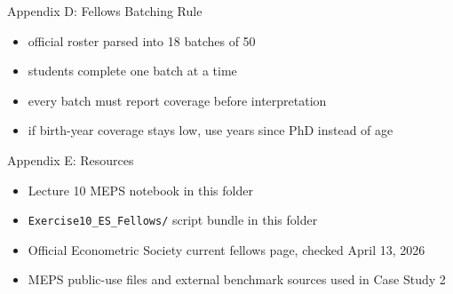 \documentclass[10pt,english,aspectratio=169]{beamer}
\begin{document}
\begin{frame}{Appendix D: Fellows Batching Rule}
\begin{itemize}
    \item official roster parsed into 18 batches of 50
    \item students complete one batch at a time
    \item every batch must report coverage before interpretation
    \item if birth-year coverage stays low, use years since PhD instead of age
\end{itemize}
\end{frame}

\begin{frame}{Appendix E: Resources}
\begin{itemize}
    \item Lecture 10 MEPS notebook in this folder
    \item \texttt{Exercise10\_ES\_Fellows/} script bundle in this folder
    \item Official Econometric Society current fellows page, checked April 13, 2026
    \item MEPS public-use files and external benchmark sources used in Case Study 2
\end{itemize}
\end{frame}
\end{document}
